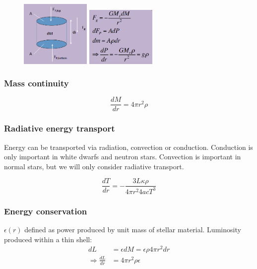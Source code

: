 \documentclass[a4paper]{article} %
\begin{document}
\begin{figure}[h]
\centering
\includegraphics[width=0.3\textwidth]{images/hydrostatic-1.png}\hspace{1.5cm}
\includegraphics[width=0.3\textwidth]{images/hydrostatic-2.png}
\end{figure}

\subsubsection{Mass continuity}
\begin{equation}
\frac{dM}{dr}=4\pi r^2\rho
\end{equation}

\subsubsection{Radiative energy transport}
Energy can be transported via radiation, convection or conduction. Conduction is only important in white dwarfs and neutron stars. Convection is important in normal stars, but we will only consider radiative transport.

\begin{equation}
\frac{dT}{dr}=-\frac{3L\kappa\rho}{4\pi r^2 4ac T^3}
\end{equation}

\subsubsection{Energy conservation}
$\epsilon(r)$ defined as power produced by unit mass of stellar material. Luminosity produced within a thin shell:
\begin{align*}
dL&=\epsilon dM=\epsilon\rho 4 \pi r^2 dr\\
\Rightarrow \frac{dL}{dr}&=4\pi r^2 \rho\epsilon
\end{align*}
\end{document}

